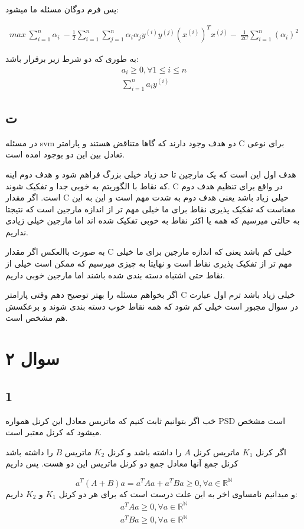 \documentclass{article}[12pt]
\begin{document}
پس فرم دوگان مسئله ما میشود:

\begin{gather*}
max \ \sum _{i=1}^{n} \alpha _{i} \ -\frac{1}{2}\sum _{i=1}^{n}\sum _{j=1}^{n} \alpha _{i} \alpha _{j} y^{( i)} y^{( j)}\left( x^{( i)}\right)^{T} x^{( j)} -\ \frac{1}{2C}\sum _{i=1}^{n}( \alpha _{i})^{2}
\end{gather*}

به طوری که دو شرط زیر برقرار باشد:
\begin{gather*}
a_i\geq 0 ,\forall 1 \leq i \leq n\\\sum _{i=1}^{n} a_{i} y^{( i)}
\end{gather*}
\clearpage
\subsection{ت}
در مسئله 
svm
دو هدف وجود دارند که گاها متناقض هستند و پارامتر C برای نوعی تعادل بین این دو بوجود امده است. 

هدف اول این است که یک مارجین تا حد زیاد خیلی بزرگ فراهم شود و هدف دوم اینه که نقاط با الگوریتم به خوبی جدا و تفکیک شوند. 
C
در واقع برای تنظیم هدف دوم است. 
اگر مقدار C
خیلی زیاد باشد یعنی هدف دوم به شدت مهم است و این به این معناست که 
تفکیک پذیری نقاط برای ما خیلی مهم تر از اندازه مارجین است که نتیجتا به حالتی میرسیم که همه یا اکثر نقاط به خوبی تفکیک شده اند اما مارجین خیلی زیادی نداریم. 

به صورت باالعکس اگر مقدار C
خیلی کم باشد یعنی که 
اندازه مارجین برای ما خیلی مهم تر از تفکیک پذیری نقاط است و نهایتا به چیزی میرسیم که ممکن است خیلی از نقاط حتی اشتباه دسته بندی شده باشند اما مارجین خوبی داریم. 

اگر بخواهم مسئله را بهتر توضیح دهم وقتی پارامتر 
C
خیلی زیاد باشد ترم اول عبارت در سوال مجبور است خیلی کم شود که همه نقاط خوب دسته بندی شوند و برعکسش هم مشخص است.
\section{سوال ۲}
\subsection{1 \label{example2-1}}
خب اگر بتوانیم ثابت کنیم که ماتریس معادل این کرنل همواره PSD 
است مشخص میشود که کرنل معتبر است. 

اگر کرنل 
$K_1$
ماتریس کرنل
$A$
را داشته باشد و کرنل
$K_2$
ماتریس 
$B$
را داشته باشد کرنل جمع آنها معادل جمع دو کرنل ماتریس این دو هست. 
پس داریم

\begin{equation}
a^T (A+B) a = a^T A a + a^T B a \geq 0 ,\forall a \in \mathbb{R}^{\mathbb{N}}
\end{equation}
و میدانیم نامساوی اخر به این علت درست است که برای هر دو کرنل 
$K_1$
و 
$K_2$
داریم:
\begin{gather}
a^T A a \geq 0 ,\forall a \in \mathbb{R}^{\mathbb{N}} \\
a^T B a \geq 0 ,\forall a \in \mathbb{R}^{\mathbb{N}}
\end{gather}
\end{document}

